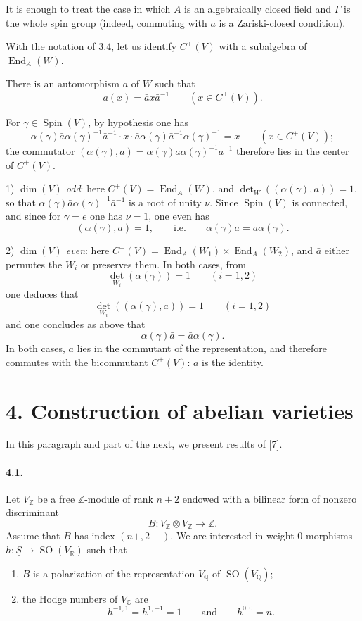 \documentclass[10pt,leqno]{article}
\newcommand{\C}{\mathbb{C}}
\newcommand{\Q}{\mathbb{Q}}
\newcommand{\R}{\mathbb{R}}
\newcommand{\Z}{\mathbb{Z}}
\newcommand{\End}{\operatorname{End}}
\newcommand{\SO}{\operatorname{SO}}
\newcommand{\Spin}{\operatorname{Spin}}
\begin{document}
It is enough to treat the case in which $A$ is an algebraically closed field and $\Gamma$ is the whole spin group (indeed, commuting with $a$ is a Zariski-closed condition).

With the notation of 3.4, let us identify $C^+(V)$ with a subalgebra of $\End_A(W)$.

There is an automorphism $\bar a$ of $W$ such that
\[
a(x)=\bar a x\bar a^{-1}\qquad(x\in C^+(V)).
\]

\clearpage

For $\gamma\in\Spin(V)$, by hypothesis one has
\[
\alpha(\gamma)\bar a\alpha(\gamma)^{-1}\bar a^{-1}\cdot x\cdot
\bar a\alpha(\gamma)\bar a^{-1}\alpha(\gamma)^{-1}=x
\qquad(x\in C^+(V));
\]
the commutator $(\alpha(\gamma),\bar a)=\alpha(\gamma)\bar a\alpha(\gamma)^{-1}\bar a^{-1}$ therefore lies in the center of $C^+(V)$.

1) \emph{$\dim(V)$ odd}: here $C^+(V)=\End_A(W)$, and $\det_W((\alpha(\gamma),\bar a))=1$, so that $\alpha(\gamma)\bar a\alpha(\gamma)^{-1}\bar a^{-1}$ is a root of unity $\nu$. Since $\Spin(V)$ is connected, and since for $\gamma=e$ one has $\nu=1$, one even has
\[
(\alpha(\gamma),\bar a)=1,
\qquad\text{i.e.}\qquad
\alpha(\gamma)\bar a=\bar a\alpha(\gamma).
\]

2) \emph{$\dim(V)$ even}: here $C^+(V)=\End_A(W_1)\times\End_A(W_2)$, and $\bar a$ either permutes the $W_i$ or preserves them. In both cases, from
\[
\det_{W_i}(\alpha(\gamma))=1\qquad(i=1,2)
\]
one deduces that
\[
\det_{W_i}((\alpha(\gamma),\bar a))=1\qquad(i=1,2)
\]
and one concludes as above that
\[
\alpha(\gamma)\bar a=\bar a\alpha(\gamma).
\]
In both cases, $\bar a$ lies in the commutant of the representation, and therefore commutes with the bicommutant $C^+(V)$: $a$ is the identity.

\section*{4. Construction of abelian varieties}

In this paragraph and part of the next, we present results of [7].

\paragraph{4.1.} Let $V_\Z$ be a free $\Z$-module of rank $n+2$ endowed with a bilinear form of nonzero discriminant
\[
B:V_\Z\otimes V_\Z\longrightarrow\Z.
\]
Assume that $B$ has index $(n+,2-)$. We are interested in weight-$0$ morphisms $h:\underline S\to\SO(V_\R)$ such that
\begin{enumerate}[label=\arabic*)]
\item $B$ is a polarization of the representation $V_\Q$ of $\SO(V_\Q)$;
\item the Hodge numbers of $V_\C$ are
\[
h^{-1,1}=h^{1,-1}=1\qquad\text{and}\qquad h^{0,0}=n.
\]
\end{enumerate}
\end{document}
